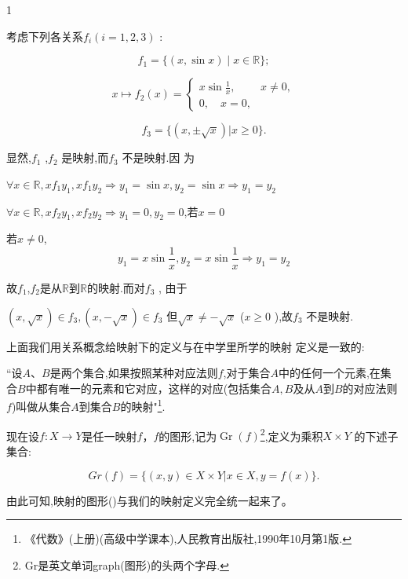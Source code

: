 \begin{sourceexample}{1}

考虑下列各关系\(f_i(i=1, 2, 3)\) :

\[f_1 = \{(x, \sin x) \mid x \in \mathbb{R}\};\]

\[x \longmapsto f_2(x) = \begin{cases} x \sin \frac{1}{x}, & x \neq 0, \\ 0, \quad  x = 0, \end{cases}\]

\[f_3 = \{(x, \pm \sqrt{x}) | x \geqslant 0\}.\]

显然,\(f_1\) ,\(f_2\) 是映射,而\(f_3\) 不是映射.因 为

\(\forall x \in \mathbb{R}, x f_1 y_1, x f_1 y_2 \Longrightarrow y_1 = \sin x, y_2 = \sin x \Longrightarrow y_1 = y_2\)

\(\forall x \in \mathbb{R}, x f_2 y_1, x f_2 y_2 \Longrightarrow y_1 = 0, y_2 = 0\),若$x=0$

若\(x \ne 0\),
\[
y_1 = x \sin \frac{1}{x} ,y_2 = x \sin \frac{1}{x} \Rightarrow y_1 = y_2 
\]


故\(f_1\),\(f_2\)是从$\mathbb{R}$到$\mathbb{R}$的映射.而对\(f_3\) , 由于

\((x, \sqrt{x}) \in f_3, (x, -\sqrt{x}) \in f_3\) 但\(\sqrt{x} \neq -\sqrt{x}\) (\(x \ge 0\) ),故\(f_3\) 不是映射.

\end{sourceexample}



上面我们用关系概念给映射下的定义与在中学里所学的映射 定义是一致的:

“设$A$、$B$是两个集合,如果按照某种对应法则$f$,对于集合$A$中的任何一个元素,在集合$B$中都有唯一的元素和它对应，这样的对应(包括集合$A,B$及从$A$到$B$的对应法则$f$)叫做从集合$A$到集合$B$的映射"\footnote[1]{《代数》(上册)(高级中学课本),人民教育出版社,1990年10月第1版.}.

现在设\(f: X \to Y\)是任一映射$f$，$f$的图形,记为$\operatorname{Gr}(f)$\footnote[2]{Gr是英文单词graph(图形)的头两个字母.},定义为乘积\(X \times Y\) 的下述子集合:

\[Gr(f) = \{(x, y) \in X \times Y | x \in X, y = f(x)\}.\]

由此可知,映射的图形()与我们的映射定义完全统一起来了。

